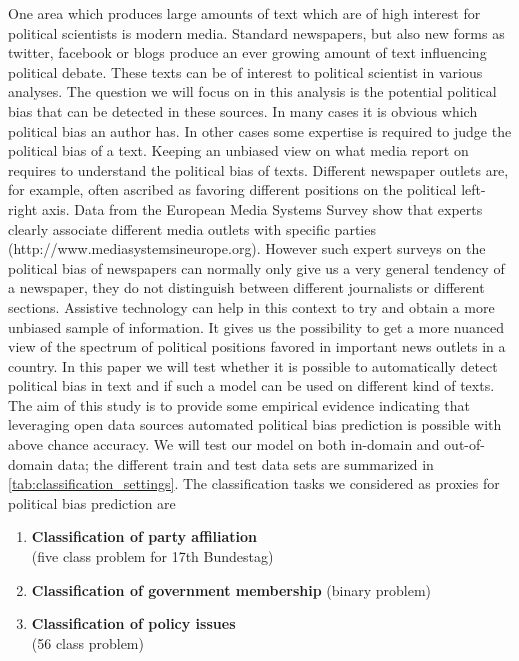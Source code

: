 \documentclass[11pt]{article}
\begin{document}
One area which produces large amounts of text which are of high interest for political scientists is modern media. Standard newspapers, but also new forms as twitter, facebook or blogs produce an ever growing amount of text influencing political debate. These texts can be of interest to political scientist in various analyses. The question we will focus on in this analysis is the potential political bias that can be detected in these sources. In many cases it is obvious which political bias an author has. In other cases some expertise is required to judge the political bias of a text. Keeping an unbiased view on what media report on requires to understand the political bias of texts. Different newspaper outlets are, for example, often ascribed as favoring different positions on the political left-right axis. Data from the European Media Systems Survey show that experts clearly associate different media outlets with specific parties (http://www.mediasystemsineurope.org). However such expert surveys on the political bias of newspapers can normally only give us a very general tendency of a newspaper, they do not distinguish between different journalists or different sections. Assistive technology can help in this context to try and obtain a more unbiased sample of information. It gives us the possibility to get a more nuanced view of the spectrum of political positions favored in important news outlets in a country. In this paper we will test whether it is possible to automatically detect political bias in text and if such a model can be used on different kind of texts. The aim of this study is to provide some empirical evidence indicating that leveraging open data sources automated political bias prediction is possible with above chance accuracy. We will test our model on both in-domain and out-of-domain data; the different train and test data sets are summarized in \autoref{tab:classification_settings}. The classification tasks we considered as proxies for political bias prediction are 

\begin{enumerate}
\item {\bf Classification of party affiliation}\\ (five class problem for 17th Bundestag)
\item {\bf Classification of government membership} (binary problem)
\item {\bf Classification of policy issues}\\ (56 class problem)
\end{enumerate}
\end{document}
